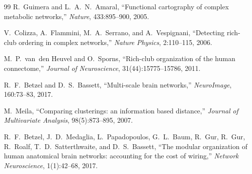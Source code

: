 \documentclass[12pt]{article}
\begin{document}
\begin{thebibliography}{99}
R.~Guimera and L.~A.~N.~Amaral,
``Functional cartography of complex metabolic networks,''
\emph{Nature}, 433:895--900, 2005.

V.~Colizza, A.~Flammini, M.~A.~Serrano, and A.~Vespignani,
``Detecting rich-club ordering in complex networks,''
\emph{Nature Physics}, 2:110--115, 2006.

M.~P.~van~den Heuvel and O.~Sporns,
``Rich-club organization of the human connectome,''
\emph{Journal of Neuroscience}, 31(44):15775--15786, 2011.

R.~F.~Betzel and D.~S.~Bassett,
``Multi-scale brain networks,''
\emph{NeuroImage}, 160:73--83, 2017.

M.~Meila,
``Comparing clusterings: an information based distance,''
\emph{Journal of Multivariate Analysis}, 98(5):873--895, 2007.

R.~F.~Betzel, J.~D.~Medaglia, L.~Papadopoulos, G.~L.~Baum,
R.~Gur, R.~Gur, R.~Roalf, T.~D.~Satterthwaite, and D.~S.~Bassett,
``The modular organization of human anatomical brain networks: accounting for the cost of wiring,''
\emph{Network Neuroscience}, 1(1):42--68, 2017.

\end{thebibliography}
\end{document}
